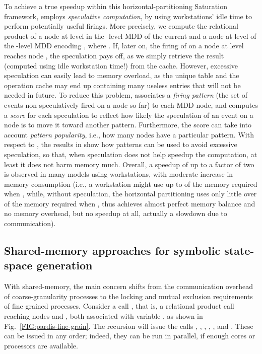 \documentclass[copyright,creativecommons]{eptcs}
\begin{document}
To achieve a true speedup within this horizontal-partitioning Saturation
framework, \cite{2005PDMC-FirePredict}
employs \emph{speculative computation}, by using workstations' idle time
to perform potentially useful firings.
More precisely, we compute the relational product of a node  at level 
in the -level MDD of the current 
and a node  at level  of the -level MDD encoding ,
where .
If, later on, the firing of  on a node at level 
reaches node , the speculation pays off, as we simply retrieve the result
(computed using idle workstation time!) from the cache.
However, excessive speculation can easily lead to memory overload, as the
unique table and the operation cache may end up containing many useless
entries that will not be needed in future.
To reduce this problem, \cite{2006IPDPS-Speculative} associates a
\emph{firing pattern} (the set of events non-speculatively fired on a node
so far) to each MDD node, and computes a \emph{score} for each speculation
to reflect how likely the speculation of an event on a node is to move it toward
another pattern.
Furthermore, the score can take into account \emph{pattern popularity},
i.e., how many nodes have a particular pattern.
With respect to \cite{2005PDMC-FirePredict}, the results in
\cite{2006IPDPS-Speculative} show how patterns can be used to avoid excessive
speculation, so that, when speculation does not help speedup the computation,
at least it does not harm memory much.
Overall, a speedup of up to a factor of two is observed in many models
using  workstations, with moderate increase in memory consumption
(i.e., a workstation might use up to  of the memory required
when , while, without speculation, the horizontal partitioning
uses only little over  of the memory required when , thus
achieves almost perfect memory balance and no memory overhead, but no speedup
at all, actually a slowdown due to communication).


\subsection{Shared-memory approaches for symbolic state-space generation}

With shared-memory, the main concern shifts from the
communication overhead of coarse-granularity processes to
the locking and mutual exclusion requirements of fine grained processes.
Consider a call , that is, a relational product call
reaching nodes  and , both associated with variable , as shown in
Fig.~\ref{FIG:pardis-fine-grain}.
The recursion will issue the calls
,
,
,
,
, and
.
These can be issued in any order;
indeed, they can be run in parallel, if enough cores or processors
are available.
\end{document}
